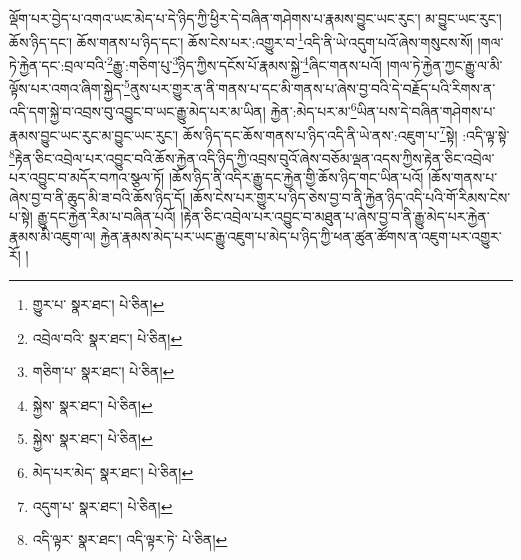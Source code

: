 ལྡོག་པར་བྱེད་པ་འགའ་ཡང་མེད་པ་དེ་ཉིད་ཀྱི་ཕྱིར་དེ་བཞིན་གཤེགས་པ་རྣམས་བྱུང་ཡང་རུང་། མ་བྱུང་ཡང་རུང་། ཆོས་ཉིད་དང་། ཆོས་གནས་པ་ཉིད་དང་། ཆོས་ངེས་པར་:འགྱུར་བ་\footnote{གྱུར་པ་  སྣར་ཐང་།  པེ་ཅིན། }འདི་ནི་ཡེ་འདུག་པའོ་ཞེས་གསུངས་སོ། །གལ་ཏེ་རྐྱེན་དང་:བྲལ་བའི་\footnote{འབྲེལ་བའི་  སྣར་ཐང་།  པེ་ཅིན། }རྒྱུ་:གཅིག་པུ་\footnote{གཅིག་པ་  སྣར་ཐང་།  པེ་ཅིན། }ཉིད་ཀྱིས་དངོས་པོ་རྣམས་སྐྱེ་\footnote{སྐྱེས་  སྣར་ཐང་།  པེ་ཅིན། }ཞིང་གནས་པའོ། །གལ་ཏེ་རྐྱེན་ཀྱང་རྒྱུ་ལ་མི་ལྟོས་པར་འགའ་ཞིག་སྐྱེད་\footnote{སྐྱེས་  སྣར་ཐང་།  པེ་ཅིན། }ནུས་པར་གྱུར་ན་ནི་གནས་པ་དང་མི་གནས་པ་ཞེས་བྱ་བའི་དེ་བརྗོད་པའི་རིགས་ན་འདི་དག་སྐྱེ་བ་འབྲས་བུ་འབྱུང་བ་ཡང་རྒྱུ་མེད་པར་མ་ཡིན། རྐྱེན་:མེད་པར་མ་\footnote{མེད་པར་མེད་  སྣར་ཐང་།  པེ་ཅིན། }ཡིན་པས་དེ་བཞིན་གཤེགས་པ་རྣམས་བྱུང་ཡང་རུང་མ་བྱུང་ཡང་རུང་། ཆོས་ཉིད་དང་ཆོས་གནས་པ་ཉིད་འདི་ནི་ཡེ་ནས་:འཇུག་པ་\footnote{འདུག་པ་  སྣར་ཐང་།  པེ་ཅིན། }སྟེ། :འདི་ལྟ་སྟེ་\footnote{འདི་ལྟར་  སྣར་ཐང་། འདི་ལྟར་ཏེ་  པེ་ཅིན། }རྟེན་ཅིང་འབྲེལ་པར་འབྱུང་བའི་ཆོས་རྐྱེན་འདི་ཉིད་ཀྱི་འབྲས་བུའོ་ཞེས་བཅོམ་ལྡན་འདས་ཀྱིས་རྟེན་ཅིང་འབྲེལ་པར་འབྱུང་བ་མདོར་བཀའ་སྩལ་ཏོ། །ཆོས་ཉིད་ནི་འདིར་རྒྱུ་དང་རྐྱེན་གྱི་ཆོས་ཉིད་གང་ཡིན་པའོ། །ཆོས་གནས་པ་ཞེས་བྱ་བ་ནི་ཆུད་མི་ཟ་བའི་ཆོས་ཉིད་དོ། །ཆོས་ངེས་པར་གྱུར་པ་ཉིད་ཅེས་བྱ་བ་ནི་རྐྱེན་ཉིད་འདི་པའི་གོ་རིམས་ངེས་པ་སྟེ། རྒྱུ་དང་རྐྱེན་རིམ་པ་བཞིན་པའོ། །རྟེན་ཅིང་འབྲེལ་པར་འབྱུང་བ་མཐུན་པ་ཞེས་བྱ་བ་ནི་རྒྱུ་མེད་པར་རྐྱེན་རྣམས་མི་འཇུག་ལ། རྐྱེན་རྣམས་མེད་པར་ཡང་རྒྱུ་འཇུག་པ་མེད་པ་ཉིད་ཀྱི་ཕན་ཚུན་ཚོགས་ན་འཇུག་པར་འགྱུར་རོ། །
